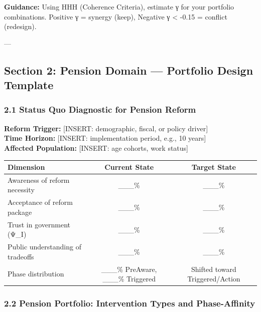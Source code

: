 \textbf{Guidance:} Using HHH (Coherence Criteria), estimate γ for your portfolio combinations. Positive γ = synergy (keep), Negative γ < -0.15 = conflict (redesign).

---


\subsection*{Section 2: Pension Domain — Portfolio Design Template}

\subsubsection*{2.1 Status Quo Diagnostic for Pension Reform}

\textbf{Reform Trigger:} [INSERT: demographic, fiscal, or policy driver] \\
\textbf{Time Horizon:} [INSERT: implementation period, e.g., 10 years] \\
\textbf{Affected Population:} [INSERT: age cohorts, work status]

\begin{center}
\begin{tabular}{@{}lcc@{}}
\toprule
\textbf{Dimension} & \textbf{Current State} & \textbf{Target State} \\
\midrule
Awareness of reform necessity & \_\_\_\% & \_\_\_\% \\
Acceptance of reform package & \_\_\_\% & \_\_\_\% \\
Trust in government (Ψ\_I) & \_\_\_\% & \_\_\_\% \\
Public understanding of tradeoffs & \_\_\_\% & \_\_\_\% \\
Phase distribution & \_\_\_\% PreAware, \_\_\_\% Triggered & Shifted toward Triggered/Action \\
\midrule
\end{tabular}
\end{center}

\subsubsection*{2.2 Pension Portfolio: Intervention Types and Phase-Affinity}

